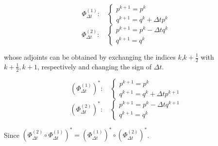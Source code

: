 
$$
\Phi_{\Delta t}^{(1)} : \quad
\left\{\begin{array}{ll}
    p^{k + 1} = p^{k}
    \\
  q^{k+ 1} = q^k + \Delta t p^k
\end{array} \right.
$$
$$
\Phi_{\Delta t}^{(2)}: \quad
\left\{\begin{array}{ll}
    p^{k+1} = p^{k } - \Delta t q^{k }
    \\
    q^{k+1} = q^{k }
\end{array} \right.
$$

whose adjoints can be obtained by exchanging the indices $k$,$k+ \frac{1}{2}$ with $k+\frac{1}{2},k+1$, respectively and changing the sign of $\Delta t$.

$$
(\Phi_{\Delta t}^{(1)})^{*} : \quad
\left\{\begin{array}{ll}
    p^{k + 1} = p^{k}
    \\
  q^{k+ 1} = q^k + \Delta t p^{k+ 1}
\end{array} \right.
$$
$$
(\Phi_{\Delta t}^{(2)})^{\ast}: \quad
\left\{\begin{array}{ll}
    p^{k+1} = p^{k } - \Delta t q^{k + 1}
    \\
    q^{k+1} = q^{k }
\end{array} \right.
$$

Since $(\Phi_{\Delta t}^{(2)} \circ \Phi_{\Delta t}^{(1)})^{\ast} = (\Phi_{\Delta t}^{(1)})^{\ast} \circ (\Phi_{\Delta t}^{(2)})^{\ast}$.
